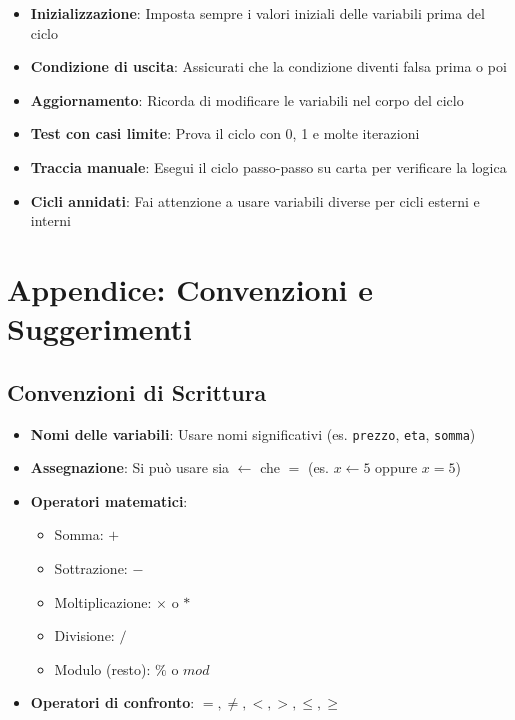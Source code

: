 \documentclass[a4paper,16pt]{article}
\begin{document}
\vspace{1cm}
\begin{tcolorbox}[colback=green!10!white,colframe=green!75!black,title=Suggerimenti per i Cicli]
\begin{itemize}
    \item \textbf{Inizializzazione}: Imposta sempre i valori iniziali delle variabili prima del ciclo
    \item \textbf{Condizione di uscita}: Assicurati che la condizione diventi falsa prima o poi
    \item \textbf{Aggiornamento}: Ricorda di modificare le variabili nel corpo del ciclo
    \item \textbf{Test con casi limite}: Prova il ciclo con 0, 1 e molte iterazioni
    \item \textbf{Traccia manuale}: Esegui il ciclo passo-passo su carta per verificare la logica
    \item \textbf{Cicli annidati}: Fai attenzione a usare variabili diverse per cicli esterni e interni
\end{itemize}
\end{tcolorbox}

\newpage
\section{Appendice: Convenzioni e Suggerimenti}

\subsection{Convenzioni di Scrittura}

\begin{itemize}[leftmargin=*]
    \item \textbf{Nomi delle variabili}: Usare nomi significativi (es. \texttt{prezzo}, \texttt{eta}, \texttt{somma})
    \item \textbf{Assegnazione}: Si può usare sia $\leftarrow$ che $=$ (es. $x \leftarrow 5$ oppure $x = 5$)
    \item \textbf{Operatori matematici}: 
    \begin{itemize}
        \item Somma: $+$
        \item Sottrazione: $-$
        \item Moltiplicazione: $\times$ o $*$
        \item Divisione: $/$
        \item Modulo (resto): $\%$ o $mod$
    \end{itemize}
    \item \textbf{Operatori di confronto}: $=, \neq, <, >, \leq, \geq$
\end{itemize}
\end{document}
